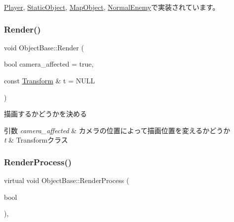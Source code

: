 \mbox{\hyperlink{class_player_a1051f85c8bf18a256d275d1a1dee5da6}{Player}}, \mbox{\hyperlink{class_static_object_afa0709f50495338a23c1140062a567af}{Static\+Object}}, \mbox{\hyperlink{class_map_object_a3043cddb8aaad0eab27a076e9bee0284}{Map\+Object}}, \mbox{\hyperlink{class_normal_enemy_ae45bd9535595f810d065b92f8dd63342}{Normal\+Enemy}}で実装されています。

\mbox{\label{class_object_base_ac84be5b56d23b8809ca08e27c0dcb16a}} 
\subsubsection{\texorpdfstring{Render()}{Render()}}
{\footnotesize\ttfamily void Object\+Base\+::\+Render (\begin{DoxyParamCaption}\item[{bool}]{camera\+\_\+affected = {\ttfamily true},  }\item[{const \mbox{\hyperlink{class_transform}{Transform}} \&}]{t = {\ttfamily NULL} }\end{DoxyParamCaption})}



描画するかどうかを決める 


\begin{DoxyParams}{引数}
{\em camera\+\_\+affected} & カメラの位置によって描画位置を変えるかどうか \\
\hline
{\em t} & Transformクラス \\
\hline
\end{DoxyParams}
\mbox{\label{class_object_base_aeac51d868beeb7f7fe900407b76b93a2}} 
\subsubsection{\texorpdfstring{Render\+Process()}{RenderProcess()}}
{\footnotesize\ttfamily virtual void Object\+Base\+::\+Render\+Process (\begin{DoxyParamCaption}\item[{bool}]{ }\end{DoxyParamCaption})\hspace{0.3cm}{\ttfamily [protected]}, {}}




